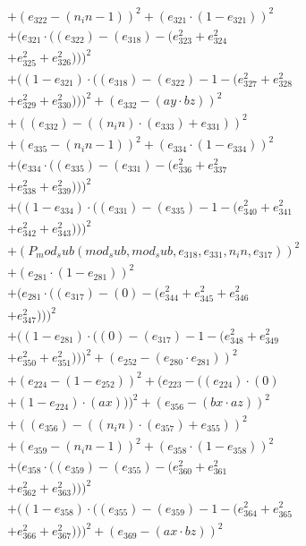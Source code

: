 \documentclass[10pt, a4paper]{article}
\begin{document}
\begin{align*}
& + (e_{322} - (n_in - 1))^{2} + (e_{321}  \cdot  (1 - e_{321}))^{2} \\
& + (e_{321}  \cdot  ((e_{322}) - (e_{318}) - (e_{323}^{2} + e_{324}^{2} \\
& + e_{325}^{2} + e_{326}^{2})))^{2} \\
& + ((1 - e_{321})  \cdot  ((e_{318}) - (e_{322}) - 1 - (e_{327}^{2} + e_{328}^{2} \\
& + e_{329}^{2} + e_{330}^{2})))^{2} + (e_{332} - (ay  \cdot  bz))^{2} \\
& + ((e_{332}) - ((n_in)  \cdot  (e_{333}) + e_{331}))^{2} \\
& + (e_{335} - (n_in - 1))^{2} + (e_{334}  \cdot  (1 - e_{334}))^{2} \\
& + (e_{334}  \cdot  ((e_{335}) - (e_{331}) - (e_{336}^{2} + e_{337}^{2} \\
& + e_{338}^{2} + e_{339}^{2})))^{2} \\
& + ((1 - e_{334})  \cdot  ((e_{331}) - (e_{335}) - 1 - (e_{340}^{2} + e_{341}^{2} \\
& + e_{342}^{2} + e_{343}^{2})))^{2} \\
& + (P_mod_sub(mod_sub, mod_sub, e_{318}, e_{331}, n_in, e_{317}))^{2} \\
& + (e_{281}  \cdot  (1 - e_{281}))^{2} \\
& + (e_{281}  \cdot  ((e_{317}) - (0) - (e_{344}^{2} + e_{345}^{2} + e_{346}^{2} \\
& + e_{347}^{2})))^{2} \\
& + ((1 - e_{281})  \cdot  ((0) - (e_{317}) - 1 - (e_{348}^{2} + e_{349}^{2} \\
& + e_{350}^{2} + e_{351}^{2})))^{2} + (e_{252} - (e_{280}  \cdot  e_{281}))^{2} \\
& + (e_{224} - (1 - e_{252}))^{2} + (e_{223} - ((e_{224})  \cdot  (0) \\
& + (1 - e_{224})  \cdot  (ax)))^{2} + (e_{356} - (bx  \cdot  az))^{2} \\
& + ((e_{356}) - ((n_in)  \cdot  (e_{357}) + e_{355}))^{2} \\
& + (e_{359} - (n_in - 1))^{2} + (e_{358}  \cdot  (1 - e_{358}))^{2} \\
& + (e_{358}  \cdot  ((e_{359}) - (e_{355}) - (e_{360}^{2} + e_{361}^{2} \\
& + e_{362}^{2} + e_{363}^{2})))^{2} \\
& + ((1 - e_{358})  \cdot  ((e_{355}) - (e_{359}) - 1 - (e_{364}^{2} + e_{365}^{2} \\
& + e_{366}^{2} + e_{367}^{2})))^{2} + (e_{369} - (ax  \cdot  bz))^{2} \\

\end{align*}
\end{document}
